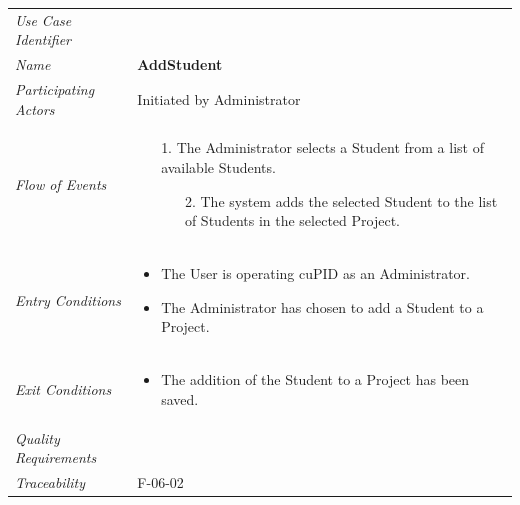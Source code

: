 \documentclass[12pt,letterpaper]{article}
\begin{document}
\begin{center}
	\begin{tabu} to 
		\toprule
		Use Case Identifier & \addstudent{} \\
		Name & {\bf AddStudent} \\
		Participating Actors & Initiated by Administrator \\
		Flow of Events & 
		\begin{minipage}[t]{\linewidth}
		    \begin{enumerate}
			    \item[1.] The Administrator selects a Student from a list of available Students.
			    \begin{enumerate}
			    	\item[2.] The system adds the selected Student to the list of Students in the selected Project.
			    \end{enumerate}
			\end{enumerate}
		\end{minipage} \\

		Entry Conditions &
		\begin{minipage}[t]{\linewidth}
			\begin{itemize}
			    \item The User is operating cuPID as an Administrator.
			    \item The Administrator has chosen to add a Student to a Project.
	        \end{itemize}
		\end{minipage} \\

		Exit Conditions &
		\begin{minipage}[t]{\linewidth}
			\begin{itemize}
			    \item The addition of the Student to a Project has been saved.
	        \end{itemize}
		\end{minipage} \\

		Quality Requirements & \\

		Traceability & F-06-02 \\
		\toprule
	\end{tabu}
\end{center}
\end{document}
